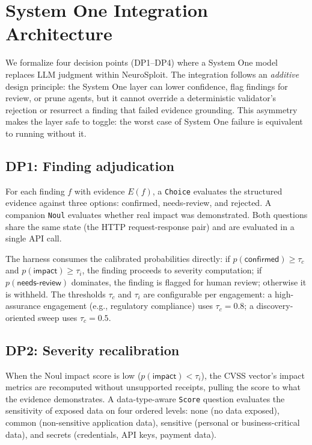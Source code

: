 \documentclass[conference]{IEEEtran}
\begin{document}
\section{System One Integration Architecture}\label{sec:integration}

We formalize four decision points (DP1--DP4) where a System One model replaces LLM judgment within NeuroSploit. The integration follows an \emph{additive} design principle: the System One layer can lower confidence, flag findings for review, or prune agents, but it cannot override a deterministic validator's rejection or resurrect a finding that failed evidence grounding. This asymmetry makes the layer safe to toggle: the worst case of System One failure is equivalent to running without it.

\subsection{DP1: Finding adjudication}

For each finding $f$ with evidence $E(f)$, a \texttt{Choice} evaluates the structured evidence against three options: \textsf{confirmed}, \textsf{needs-review}, and \textsf{rejected}. A companion \texttt{Noul} evaluates whether real impact was demonstrated. Both questions share the same state (the HTTP request-response pair) and are evaluated in a single API call.

The harness consumes the calibrated probabilities directly: if $p(\textsf{confirmed}) \geq \tau_c$ and $p(\textsf{impact}) \geq \tau_i$, the finding proceeds to severity computation; if $p(\textsf{needs-review})$ dominates, the finding is flagged for human review; otherwise it is withheld. The thresholds $\tau_c$ and $\tau_i$ are configurable per engagement: a high-assurance engagement (e.g., regulatory compliance) uses $\tau_c = 0.8$; a discovery-oriented sweep uses $\tau_c = 0.5$.

\subsection{DP2: Severity recalibration}

When the Noul impact score is low ($p(\textsf{impact}) < \tau_i$), the CVSS vector's impact metrics are recomputed without unsupported receipts, pulling the score to what the evidence demonstrates. A data-type-aware \texttt{Score} question evaluates the sensitivity of exposed data on four ordered levels: \textsf{none} (no data exposed), \textsf{common} (non-sensitive application data), \textsf{sensitive} (personal or business-critical data), and \textsf{secrets} (credentials, API keys, payment data).
\end{document}

